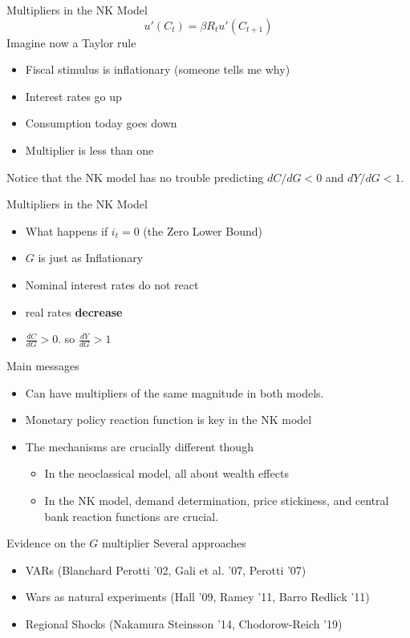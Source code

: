 \documentclass[11pt,aspectratio=169,xcolor={dvipsnames},hyperref={pdftex,pdfpagemode=UseNone,hidelinks,pdfdisplaydoctitle=true},usepdftitle=false]{beamer}
\begin{document}
\begin{frame}{Multipliers in the NK Model}
$$u'(C_t) = \beta R_t u'(C_{t+1})$$
Imagine now a Taylor rule
\begin{itemize}
\item Fiscal stimulus is inflationary (someone tells me why)
\item Interest rates go up
\item Consumption today goes down
\item Multiplier is less than one
\end{itemize}
Notice that the NK model has no trouble predicting $dC/dG < 0$ and $dY/dG < 1$.
\end{frame}

\begin{frame}{Multipliers in the NK Model}
\begin{itemize}
\item What happens if $i_t = 0$ (the Zero Lower Bound)
\item $G$ is just as Inflationary
\item Nominal interest rates do not react
\item real rates \textbf{decrease}
\item $\frac{dC}{dG} > 0$. so $\frac{dY}{dG} > 1$
\end{itemize}
\end{frame}

\begin{frame}{Main messages}
\begin{itemize}
\item Can have multipliers of the same magnitude in both models.
\item Monetary policy reaction function is key in the NK model
\item The mechanisms are crucially different though
\begin{itemize}
\item In the neoclassical model, all about wealth effects
\item In the NK model, demand determination, price stickiness, and central bank reaction functions are crucial.
\end{itemize}
\end{itemize}
\end{frame}


\begin{frame}{Evidence on the $G$ multiplier}
Several approaches
\begin{itemize}
\item VARs (Blanchard Perotti '02, Gali et al. '07, Perotti '07)
\item Wars as natural experiments (Hall '09, Ramey '11, Barro Redlick '11)
\item Regional Shocks (Nakamura Steinsson '14, Chodorow-Reich '19)
\end{itemize}
\end{frame}
\end{document}
